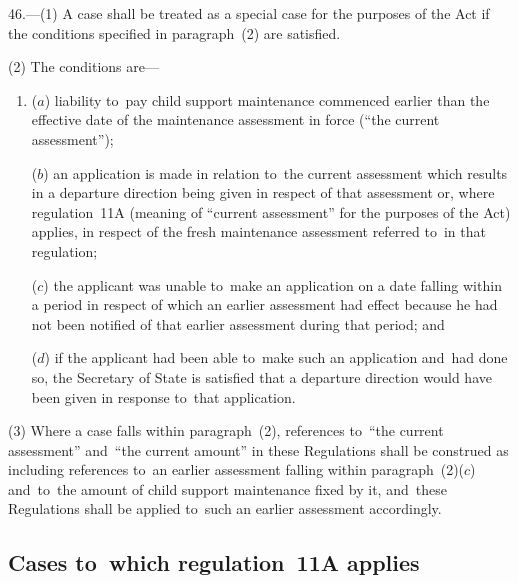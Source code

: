\documentclass[12pt,a4paper]{article}
\begin{document}
46.—(1) A case shall be treated as a special case for
the purposes of the Act if the conditions specified in paragraph~(2) are
satisfied.

(2) The conditions are—
\begin{enumerate}\item[]
($a$) liability to~pay child support maintenance commenced earlier than the
effective date of the maintenance assessment in force (“the current
assessment”);

($b$) an application is made 
in relation to~the current assessment which results in a departure direction being given in respect of that assessment
or, where regulation~11A (meaning of “current assessment” for the purposes of the Act) applies, in respect of the fresh maintenance assessment referred to~in that regulation;  %

($c$) the applicant was unable to~make an application on a date falling within a
period in respect of which an earlier assessment had effect because he had not
been notified of that earlier assessment during that period; and

($d$) if the applicant had been able to~make such an application and~had done so,
the Secretary of State is satisfied that a departure direction would have been
given in response to~that application.
\end{enumerate}

(3) Where a case falls within paragraph~(2), references to~“the current
assessment” and~“the current amount” in these Regulations shall be construed as
including references to~an earlier assessment falling within paragraph~(2)($c$)
and~to~the amount of child support maintenance fixed by it, and~these
Regulations shall be applied to~such an earlier assessment accordingly.


\subsection[46A. Cases to~which regulation~11A applies]{Cases to~which regulation~11A applies}
\end{document}

